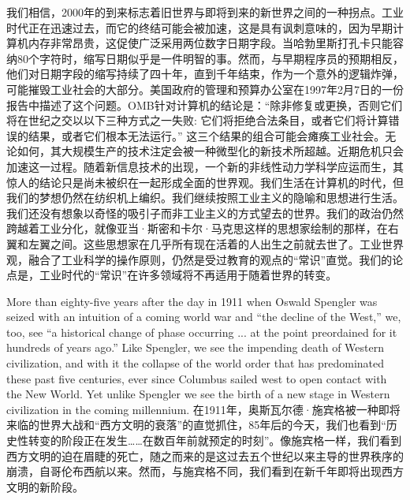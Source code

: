 \begin{Parallel}{97mm}{45mm}
  {\small 我们相信，2000年的到来标志着旧世界与即将到来的新世界之间的一种拐点。工业时代正在迅速过去，而它的终结可能会被加速，这是具有讽刺意味的，因为早期计算机内存非常昂贵，这促使广泛采用两位数字日期字段。当哈勃里斯打孔卡只能容纳80个字符时，缩写日期似乎是一件明智的事。然而，与早期程序员的预期相反，他们对日期字段的缩写持续了四十年，直到千年结束，作为一个意外的逻辑炸弹，可能摧毁工业社会的大部分。美国政府的管理和预算办公室在1997年2月7日的一份报告中描述了这个问题。OMB针对计算机的结论是：“除非修复或更换，否则它们将在世纪之交以以下三种方式之一失败: 它们将拒绝合法条目，或者它们将计算错误的结果，或者它们根本无法运行。” 这三个结果的组合可能会瘫痪工业社会。无论如何，其大规模生产的技术注定会被一种微型化的新技术所超越。近期危机只会加速这一过程。随着新信息技术的出现，一个新的非线性动力学科学应运而生，其惊人的结论只是尚未被织在一起形成全面的世界观。我们生活在计算机的时代，但我们的梦想仍然在纺织机上编织。我们继续按照工业主义的隐喻和思想进行生活。我们还没有想象以奇怪的吸引子而非工业主义的方式望去的世界。我们的政治仍然跨越着工业分化，就像亚当·斯密和卡尔·马克思这样的思想家绘制的那样，在右翼和左翼之间。这些思想家在几乎所有现在活着的人出生之前就去世了。工业世界观，融合了工业科学的操作原则，仍然是受过教育的观点的“常识”直觉。我们的论点是，工业时代的“常识”在许多领域将不再适用于随着世界的转变。}
  \ParallelPar

  \ParallelLText
  {More than eighty-five years after the day in 1911 when Oswald Spengler was seized with an intuition of a coming world war and “the decline of the West,” we, too, see “a historical change of phase occurring ... at the point preordained for it hundreds of years ago.” Like Spengler, we see the impending death of Western civilization, and with it the collapse of the world order that has predominated these past five centuries, ever since Columbus sailed west to open contact with the New World. Yet unlike Spengler we see the birth of a new stage in Western civilization in the coming millennium.   }  
  \ParallelRText
  {\small 在1911年，奥斯瓦尔德·施宾格被一种即将来临的世界大战和“西方文明的衰落”的直觉抓住，85年后的今天，我们也看到“历史性转变的阶段正在发生……在数百年前就预定的时刻”。像施宾格一样，我们看到西方文明的迫在眉睫的死亡，随之而来的是这过去五个世纪以来主导的世界秩序的崩溃，自哥伦布西航以来。然而，与施宾格不同，我们看到在新千年即将出现西方文明的新阶段。}
  \ParallelPar

\end{Parallel}